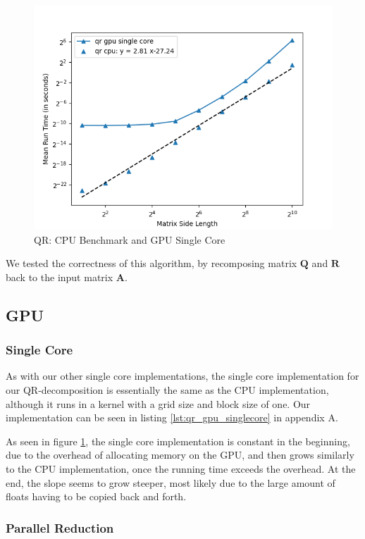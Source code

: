 \begin{figure}[h]
  \includegraphics[width=.7\textwidth]{SavedBenchmarksAndDiagrams/Machine 2/QR/GPU SC.png}
  \centering
  \caption{QR: CPU Benchmark and GPU Single Core}
  \label{fig:qr_cpu_gpu_sc}
\end{figure}

We tested the correctness of this algorithm, by recomposing matrix $\mathbf{Q}$ and $\mathbf{R}$ back to the input matrix $\mathbf{A}$.

\subsection{GPU} 

\subsubsection{Single Core}
As with our other single core implementations, the single core implementation for our QR-decomposition is essentially the same as the CPU implementation, although it runs in a kernel with a grid size and block size of one. Our implementation can be seen in listing \ref{lst:qr_gpu_singlecore} in appendix A.

As seen in figure \ref{fig:qr_cpu_gpu_sc}, the single core implementation is constant in the beginning, due to the overhead of allocating memory on the GPU, and then grows similarly to the CPU implementation, once the running time exceeds the overhead. At the end, the slope seems to grow steeper, most likely due to the large amount of floats having to be copied back and forth.

\subsubsection{Parallel Reduction}

